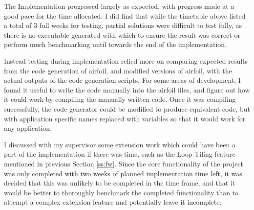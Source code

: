 The Implementation progressed largely as expected, with progress made at a good pace for the time allocated. I did find that while the timetable above listed a total of 3 full weeks for testing, partial solutions were difficult to test fully, as there is no executable generated with which to ensure the result was correct or perform much benchmarking until towards the end of the implementation.
\par
Instead testing during implementation relied more on comparing expected results from the code generation of airfoil, and modified versions of airfoil, with the actual outputs of the code generation scripts. For some areas of development, I found it useful to write the code manually into the airfoil files, and figure out how it could work by compiling the manually written code. Once it was compiling successfully, the code generator could be modified to produce equivalent code, but with application specific names replaced with variables so that it would work for any application.
\par
I discussed with my supervisor some extension work which could have been a part of the implementation if there was time, such as the Loop Tiling feature mentioned in previous Section \ref{ss:fw}. Since the core functionality of the project was only completed with two weeks of planned implementation time left, it was decided that this was unlikely to be completed in the time frame, and that it would be better to thoroughly benchmark the completed functionality than to attempt a complex extension feature and potentially leave it incomplete.

